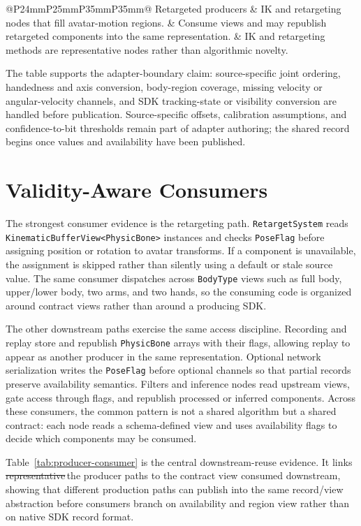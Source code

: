 \documentclass[runningheads]{llncs}
\newcommand{\radd}[1]{\textcolor{revadd}{#1}}
\newcommand{\rdel}[1]{\textcolor{revdel}{\sout{#1}}}
\newcommand{\rrep}[2]{\rdel{#1}\,\radd{#2}}
\newcommand{\radd}[1]{#1}
\newcommand{\rdel}[1]{}
\newcommand{\rrep}[2]{#2}
\begin{document}
\begin{table}[t]
\begin{tabular}{@{}P{24mm}P{25mm}P{35mm}P{35mm}@{}}
		Retargeted producers         & IK and retargeting nodes that fill avatar-motion regions.                                           & Consume views and may republish retargeted components into the same representation.                              & IK and retargeting methods are representative nodes rather than algorithmic novelty.                  \\
		\bottomrule
	\end{tabular}
\end{table}

The table supports the adapter-boundary claim: source-specific joint ordering, handedness and axis conversion, body-region coverage, missing velocity or angular-velocity channels, and SDK tracking-state or visibility conversion are handled before publication. Source-specific offsets, calibration assumptions, and confidence-to-bit thresholds remain part of adapter authoring; the shared record begins once values and availability have been published.

\section{Validity-Aware Consumers}\label{sec:consumers}
The strongest consumer evidence is the retargeting path. \texttt{RetargetSystem} reads \texttt{KinematicBufferView<PhysicBone>} instances and checks \texttt{PoseFlag} before assigning position or rotation to avatar transforms. If a component is unavailable, the assignment is skipped rather than silently using a default or stale source value. The same consumer dispatches across \texttt{BodyType} views such as full body, upper/lower body, two arms, and two hands, so the consuming code is organized around contract views rather than around a producing SDK.

The other downstream paths exercise the same access discipline. Recording and replay store and republish \texttt{PhysicBone} arrays with their flags, allowing replay to appear as another producer in the same representation. Optional network serialization writes the \texttt{PoseFlag} before optional channels so that partial records preserve availability semantics. Filters and inference nodes read upstream views, gate access through flags, and republish processed or inferred components. Across these consumers, the common pattern is not a shared algorithm but a shared contract: each node reads a schema-defined view and uses availability flags to decide which components may be consumed.

Table~\ref{tab:producer-consumer} is the central downstream-reuse evidence. It links \rrep{representative}{the} producer paths to the contract view consumed downstream, showing that different production paths can publish into the same record/view abstraction before consumers branch on availability and region view rather than on native SDK record format.
\end{document}
